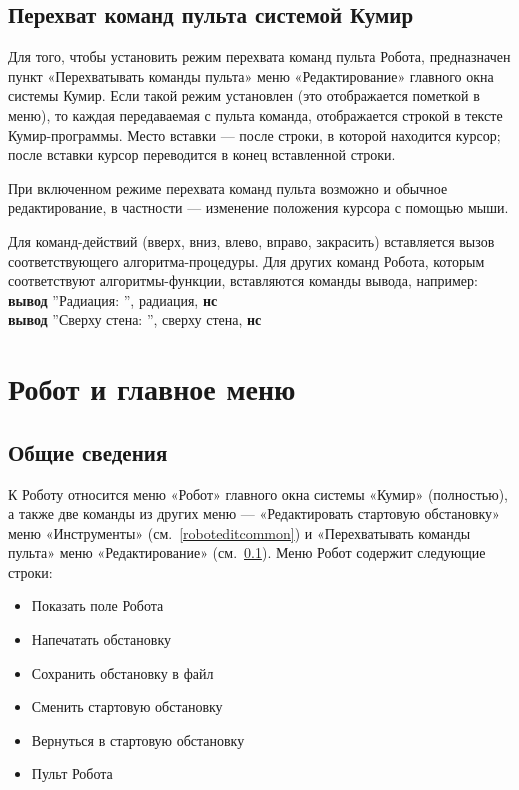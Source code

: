 \subsection{Перехват команд пульта системой Кумир}
\label{robotcatchcommands}

Для того, чтобы установить режим перехвата команд пульта Робота, предназначен пункт «Перехватывать команды пульта» меню «Редактирование» главного окна системы Кумир. Если такой режим установлен (это отображается пометкой в меню), то каждая передаваемая с пульта команда, отображается строкой в тексте Кумир-программы. Место вставки --- после строки, в которой находится курсор; после вставки курсор переводится в конец вставленной строки.

При включенном режиме перехвата команд пульта возможно и обычное редактирование, в частности --- изменение положения курсора с помощью мыши.

Для команд-действий (вверх, вниз, влево, вправо, закрасить) вставляется вызов соответствующего алгоритма-процедуры. Для других команд Робота, которым соответствуют алгоритмы-функции, вставляются команды вывода, например:\\
{\sffamily
\textbf{вывод} ''Радиация: '', радиация, \textbf{нс}\\
\textbf{вывод} ''Сверху стена: '', сверху стена, \textbf{нс}}

\section{Робот и главное меню}

\subsection{Общие сведения}

К Роботу относится меню «Робот» главного окна системы «Кумир» (полностью), а также две команды из других меню --- «Редактировать стартовую обстановку» меню «Инструменты» (см.~\ref{roboteditcommon}) и «Перехватывать команды пульта» меню «Редактирование» (см.~\ref{robotcatchcommands}). Меню Робот содержит следующие строки:
\begin{itemize}
\item Показать поле Робота
\item Напечатать обстановку
\item Сохранить обстановку в файл
\item Сменить стартовую обстановку
\item Вернуться в стартовую обстановку
\item Пульт Робота
\end{itemize}

